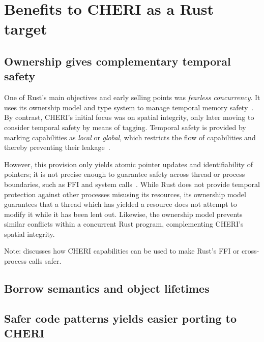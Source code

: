 \documentclass[dissertation.tex]{subfiles}
\begin{document}
\section{Benefits to CHERI as a Rust target}
\label{sec:eval-cheri}

\subsection{Ownership gives complementary temporal safety}
\label{sec:eval-cheri-spatial-temporal}


One of Rust's main objectives and early selling points was
\emph{fearless concurrency}.
It uses its ownership model and type system to manage temporal memory
safety~\cite{rust-trpl-book}.
By contrast, CHERI's initial focus was on spatial integrity, only later
moving to consider temporal safety by means of tagging.
Temporal safety is provided by marking capabilities as \emph{local} or
\emph{global}, which restricts the flow of capabilities and thereby
preventing their leakage~\cite{cheri2015}.

However, this provision only yields atomic pointer updates and
identifiability of pointers;
it is not precise enough to guarantee safety across thread or process
boundaries, such as FFI and system calls~\cite{cheri-2019-abstract}.
While Rust does not provide temporal protection against other processes
misusing its resources, its ownership model guarantees that a thread
which has yielded a resource does not attempt to modify it while it has
been lent out.
Likewise, the ownership model prevents similar conflicts within a
concurrent Rust program, complementing CHERI's spatial integrity.

Note:  discusses how CHERI capabilities can
be used to make Rust's FFI or cross-process calls safer.


\subsection{Borrow semantics and object lifetimes}


\subsection{Safer code patterns yields easier porting to CHERI}
\label{sec:eval-cheri-port}
\end{document}
